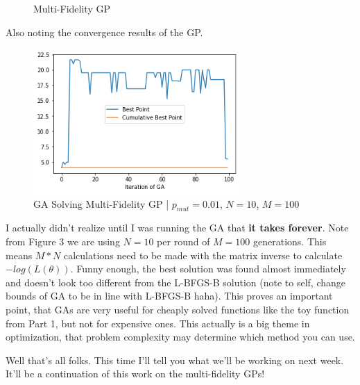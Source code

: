 \documentclass[12pt]{article}
\begin{document}
\begin{figure}[h]
\centering
{}
\caption{Multi-Fidelity GP}
\end{figure}

\vspace{5mm}

Also noting the convergence results of the GP.

\begin{figure}[h]
\centering
\includegraphics[width=0.7\textwidth]{Post_11_ga3}
\caption{GA Solving Multi-Fidelity GP | $p_{mut}=0.01$, $N=10$, $M=100$}
\end{figure}

\vspace{5mm}

I actually didn't realize until I was running the GA that \textbf{it takes forever}. Note from Figure 3 we are using $N=10$ per round of $M=100$ generations. This means $M*N$ calculations need to be made with the matrix inverse to calculate $-log(L(\theta))$. Funny enough, the best solution was found almost immediately and doesn't look too different from the L-BFGS-B solution (note to self, change bounds of GA to be in line with L-BFGS-B haha). This proves an important point, that GAs are very useful for cheaply solved functions like the toy function from Part 1, but not for expensive ones. This actually is a big theme in optimization, that problem complexity may determine which method you can use. 

\vspace{5mm}

Well that's all folks. This time I'll tell you what we'll be working on next week. It'll be a continuation of this work on the multi-fidelity GPs!
\end{document}
